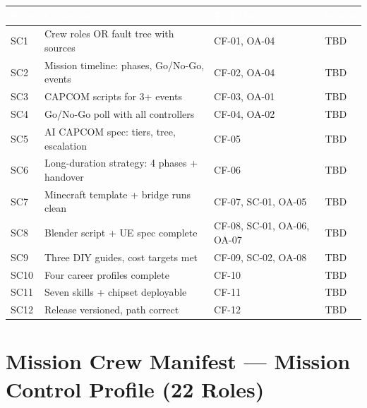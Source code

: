 \documentclass[11pt,letterpaper]{article}
\newcommand{\tableheader}[1]{\textbf{\sffamily\textcolor{white}{#1}}}
\begin{document}
\begin{center}
\begin{tabularx}{\textwidth}{L{0.8cm}L{5.5cm}L{2.8cm}C{1.3cm}}
\toprule
{}
\tableheader{SC\#} & \tableheader{Criterion} & \tableheader{Test IDs} & \tableheader{Status} \\
\midrule
SC1 & Crew roles OR fault tree with sources & CF-01, OA-04 & TBD \\
SC2 & Mission timeline: phases, Go/No-Go, events & CF-02, OA-04 & TBD \\
SC3 & CAPCOM scripts for 3+ events & CF-03, OA-01 & TBD \\
SC4 & Go/No-Go poll with all controllers & CF-04, OA-02 & TBD \\
SC5 & AI CAPCOM spec: tiers, tree, escalation & CF-05 & TBD \\
SC6 & Long-duration strategy: 4 phases + handover & CF-06 & TBD \\
SC7 & Minecraft template + bridge runs clean & CF-07, SC-01, OA-05 & TBD \\
SC8 & Blender script + UE spec complete & CF-08, SC-01, OA-06, OA-07 & TBD \\
SC9 & Three DIY guides, cost targets met & CF-09, SC-02, OA-08 & TBD \\
SC10 & Four career profiles complete & CF-10 & TBD \\
SC11 & Seven skills + chipset deployable & CF-11 & TBD \\
SC12 & Release versioned, path correct & CF-12 & TBD \\
\bottomrule
\end{tabularx}
\end{center}

\section{Mission Crew Manifest --- Mission Control Profile (22 Roles)}
\end{document}
